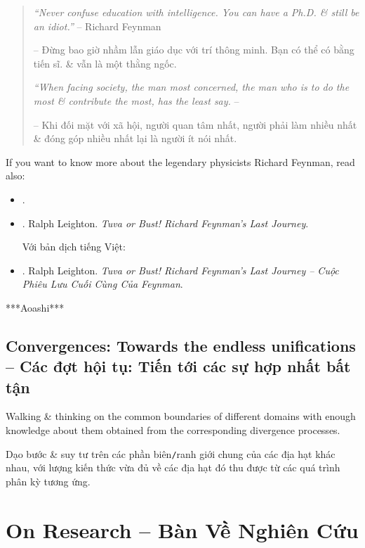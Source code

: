 \documentclass[12pt]{article}
\begin{document}
\begin{quotation}
	{\it``Never confuse education with intelligence. You can have a Ph.D. \& still be an idiot.''} -- {\sc Richard Feynman}
	
	-- Đừng bao giờ nhầm lẫn giáo dục với trí thông minh. Bạn có thể có bằng tiến sĩ. \& vẫn là một thằng ngốc.	
	
	{\it``When facing society, the man most concerned, the man who is to do the most \& contribute the most, has the least say.} -- \cite{Rand_fountainhead}
	
	-- Khi đối mặt với xã hội, người quan tâm nhất, người phải làm nhiều nhất \& đóng góp nhiều nhất lại là người ít nói nhất.
\end{quotation}
If you want to know more about the legendary physicists {\sc Richard Feynman}, read also:
\begin{itemize}
	\item \cite{Leighton_Feyman_last_journey}. \item \cite{Leighton_Feyman_last_journey_VN}. {\sc Ralph Leighton}. {\it Tuva or Bust! Richard Feynman's Last Journey}.
	
	Với bản dịch tiếng Việt:
	\item \cite{Leighton_Feyman_last_journey_VN}. {\sc Ralph Leighton}. {\it Tuva or Bust! Richard Feynman's Last Journey -- Cuộc Phiêu Lưu Cuối Cùng Của Feynman}.
\end{itemize}


***Aoashi***

\subsection{Convergences: Towards the endless unifications -- Các đợt hội tụ: Tiến tới các sự hợp nhất bất tận}
Walking \& thinking on the common boundaries of different domains with enough knowledge about them obtained from the corresponding divergence processes.

Dạo bước \& suy tư trên các phần biên{\tt/}ranh giới chung của các địa hạt khác nhau, với lượng kiến thức vừa đủ về các địa hạt đó thu được từ các quá trình phân kỳ tương ứng.


\section{On Research -- Bàn Về Nghiên Cứu}
\label{sect: research}
\end{document}
